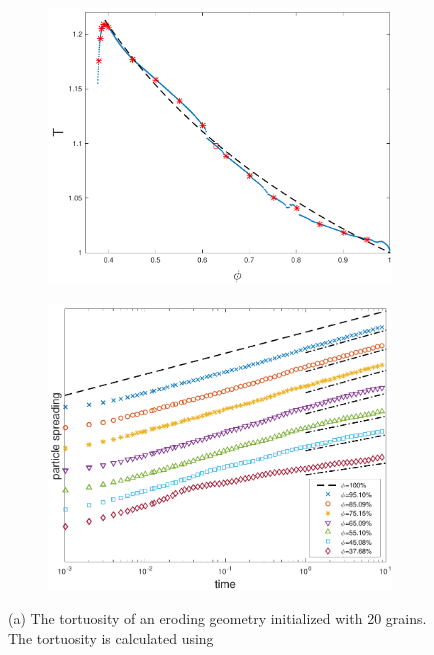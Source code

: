 \documentclass{jfm}
\begin{document}
\begin{figure}
\begin{subfigure}[b]{0.5\textwidth}
\includegraphics*[height = 0.8\linewidth]{./figs/tort_eulerian}
\caption{}
\end{subfigure}
\begin{subfigure}[b]{0.5\textwidth}
\includegraphics*[height = 0.8\linewidth]{./figs/20b_second_moment_long_ref}
\caption{}
\end{subfigure}
\caption{\label{fig:Eroding20Transport} (a) The tortuosity of an eroding
geometry initialized with 20 grains.  The tortuosity is calculated using
}
\end{figure}
\end{document}
